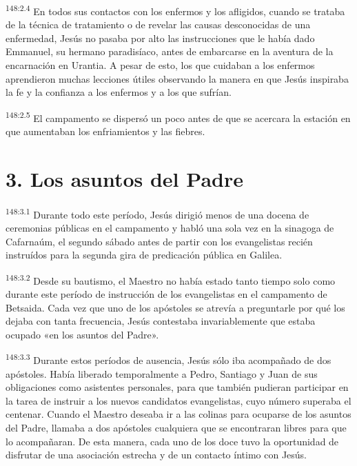 \par
\textsuperscript{148:2.4} En todos sus contactos con los enfermos y los afligidos, cuando se trataba de la técnica de tratamiento o de revelar las causas desconocidas de una enfermedad, Jesús no pasaba por alto las instrucciones que le había dado Emmanuel, su hermano paradisíaco, antes de embarcarse en la aventura de la encarnación en Urantia. A pesar de esto, los que cuidaban a los enfermos aprendieron muchas lecciones útiles observando la manera en que Jesús inspiraba la fe y la confianza a los enfermos y a los que sufrían.

\par
\textsuperscript{148:2.5} El campamento se dispersó un poco antes de que se acercara la estación en que aumentaban los enfriamientos y las fiebres.

\section*{3. Los asuntos del Padre}
\par
\textsuperscript{148:3.1} Durante todo este período, Jesús dirigió menos de una docena de ceremonias públicas en el campamento y habló una sola vez en la sinagoga de Cafarnaúm, el segundo sábado antes de partir con los evangelistas recién instruídos para la segunda gira de predicación pública en Galilea.

\par
\textsuperscript{148:3.2} Desde su bautismo, el Maestro no había estado tanto tiempo solo como durante este período de instrucción de los evangelistas en el campamento de Betsaida. Cada vez que uno de los apóstoles se atrevía a preguntarle por qué los dejaba con tanta frecuencia, Jesús contestaba invariablemente que estaba ocupado «en los asuntos del Padre».

\par
\textsuperscript{148:3.3} Durante estos períodos de ausencia, Jesús sólo iba acompañado de dos apóstoles. Había liberado temporalmente a Pedro, Santiago y Juan de sus obligaciones como asistentes personales, para que también pudieran participar en la tarea de instruir a los nuevos candidatos evangelistas, cuyo número superaba el centenar. Cuando el Maestro deseaba ir a las colinas para ocuparse de los asuntos del Padre, llamaba a dos apóstoles cualquiera que se encontraran libres para que lo acompañaran. De esta manera, cada uno de los doce tuvo la oportunidad de disfrutar de una asociación estrecha y de un contacto íntimo con Jesús.

